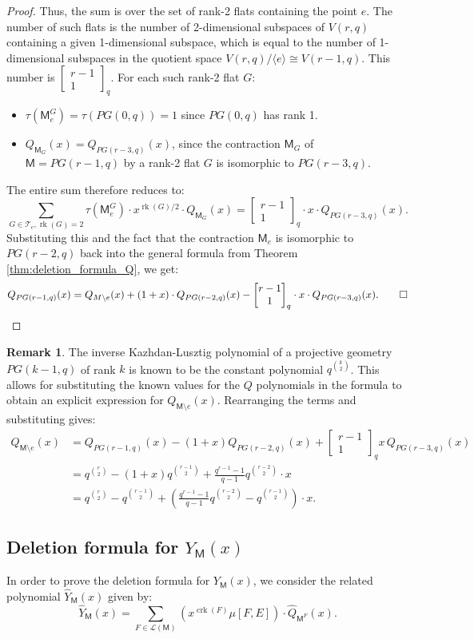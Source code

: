 \documentclass[11pt, a4paper, english]{amsart}
\theoremstyle{teoremas}
\theoremstyle{definition}
\newtheorem{remark}[theorem]{Remark}
\DeclareMathOperator{\rk}{rk}
\newcommand{\M}{\mathsf{M}}
\newcommand{\corank}{\operatorname{crk}}
\newcommand{\qbinom}[2]{\begin{bmatrix} #1 \\ #2 \end{bmatrix}_q}
\begin{document}
\begin{proof}
    Thus, the sum is over the set of rank-2 flats containing the point $e$.
    The number of such flats is the number of 2-dimensional subspaces of $V(r,q)$ containing a given 1-dimensional subspace, which is equal to the number of 1-dimensional subspaces in the quotient space $V(r,q)/\langle e \rangle \cong V(r-1,q)$. This number is $\qbinom{r-1}{1}$. For each such rank-2 flat $G$:
    \begin{itemize}
        \item $\tau(\M^G_e) = \tau(PG(0,q)) = 1$ since $PG(0,q)$ has rank 1.
        \item $Q_{\M_G}(x) = Q_{PG(r-3,q)}(x)$, since the contraction $\M_G$ of $\M=PG(r-1,q)$ by a rank-2 flat $G$ is isomorphic to $PG(r-3,q)$.
    \end{itemize}
    The entire sum therefore reduces to:
    \[
        \sum_{G \in \mathscr{T}_e, \rk(G)=2} \tau(\M^G_e)\cdot x^{\rk(G)/2} \cdot Q_{\M_G}(x) = \qbinom{r-1}{1} \cdot x \cdot Q_{PG(r-3,q)}(x).
    \]
    Substituting this and the fact that the contraction $\M_e$ is isomorphic to $PG(r-2,q)$ back into the general formula from Theorem \ref{thm:deletion_formula_Q}, we get:
    \[
        Q_{PG(r-1,q)}(x) = Q_{M\setminus e}(x) + (1 + x)\cdot Q_{PG(r-2,q)}(x) - \qbinom{r-1}{1} \cdot x \cdot Q_{PG(r-3,q)}(x). \qed
    \]
\end{proof}

\begin{remark}
    The inverse Kazhdan-Lusztig polynomial of a projective geometry $PG(k-1,q)$ of rank $k$ is known to be the constant polynomial $q^{\binom{k}{2}}$. This allows for substituting the known values for the $Q$ polynomials in the formula to obtain an explicit expression for $Q_{\M\setminus e}(x)$. Rearranging the terms and substituting gives:
    \begin{align*}
        Q_{\M\setminus e}(x) & = Q_{PG(r-1,q)}(x) - (1+x)Q_{PG(r-2,q)}(x) + \qbinom{r-1}{1} x \, Q_{PG(r-3,q)}(x)                                            \\
                             & = q^{\binom{r}{2}} - (1+x)q^{\binom{r-1}{2}} + \frac{q^{r-1}-1}{q-1} q^{\binom{r-2}{2}}\cdot x                                \\
                             & = q^{\binom{r}{2}} - q^{\binom{r-1}{2}} + \left(\frac{q^{r-1}-1}{q-1} q^{\binom{r-2}{2}} - q^{\binom{r-1}{2}}\right) \cdot x.
    \end{align*}
\end{remark}

\subsection{Deletion formula for $Y_{\M}(x)$}
In order to prove the deletion formula for $Y_{\M}(x)$, we consider the related polynomial $\hat{Y}_{\M}(x)$ given by:
\[
    \hat{Y}_{\M}(x) = \sum_{F \in \mathcal{L}(\M)} \left( x^{\corank(F)}\mu[F,E] \right) \cdot \hat{Q}_{\M^F}(x).
\]
\end{document}
